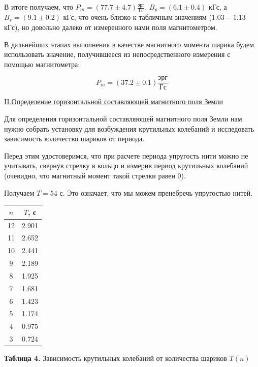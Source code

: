 \documentclass{article}
\begin{document}
В итоге получаем, что $P_m = (77.7 \pm 4.7) \frac{\text{эрг}}{\text{Гс}}$. $B_p = (6.1 \pm 0.4)$ кГс, а $B_r = (9.1 \pm 0.2) $ кГс, что очень близко к табличным значениям ($1.03 - 1.13$ кГс), но довольно далеко от измеренного нами поля магнитометром.

В дальнейших этапах выполнения в качестве магнитного момента шарика будем использовать значение, получившееся из непосредственного измерения с помощью магнитометра:

\[
    P_{m} = (37.2 \pm 0.1) \frac{\text{эрг}}{\text{Гс}} 
\]

\begin{center}
    \underline{\large {\RN{2}.Определение горизонтальной составляющей магнитного поля Земли}}
\end{center}

Для определения горизонтальной составляющей магнитного поля Земли нам нужно собрать установку для возбуждения крутильных колебаний и исследовать зависимость количество шариков от периода. 

Перед этим удостоверимся, что при расчете периода упругость нити можно не учитывать, свернув стрелку в кольцо и измерив период крутильных колебаний (очевидно, что магнитный момент такой стрелки равен 0).

Получаем $T = 54$ с. Это означает, что мы можем пренебречь упругостью нитей.

\begin{center}
    \begin{tabular}{|c|c|}
        \hline
        $n$ & $T$, с \\
        \hline
        12 & 2.901 \\
        \hline
        11 &  2.652 \\
        \hline
        10 & 2.441 \\
        \hline
        9 & 2.189 \\
        \hline
        8 & 1.925 \\
        \hline
        7 & 1.681 \\
        \hline
        6 & 1.423 \\
        \hline
        5 & 1.174 \\
        \hline
        4 & 0.975 \\ 
        \hline
        3 & 0.724 \\
        \hline
    \end{tabular}
    
    \textbf{Таблица 4. } Зависимость крутильных колебаний от количества шариков $T(n)$
\end{center}
\end{document}
